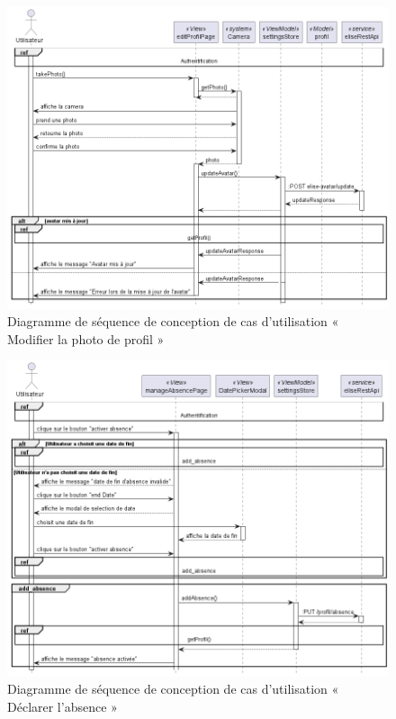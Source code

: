 \begin{figure}[H]
  \centering
  \includegraphics[width=1\textwidth]{out/diagrams/sprint6/sequence_edit_profil_avatar/sequence_edit_profil_avatar}
  \caption{Diagramme de séquence de conception de cas d'utilisation «  Modifier la photo de profil »}
  \label{fig:conception_sequence_edit_profil_avatar}
\end{figure}

\begin{figure}[H]
  \centering
  \includegraphics[width=1\textwidth]{out/diagrams/sprint6/sequence_declare_absence/sequence_declare_absence}
  \caption{Diagramme de séquence de conception de cas d'utilisation «  Déclarer l'absence »}
  \label{fig:conception_sequence_declare_absence}
\end{figure}

